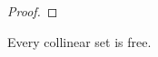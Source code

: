 \documentclass{patmorin}
\begin{document}
\begin{proof}
%
\end{proof}

\begin{cor}
  Every collinear set is free.
\end{cor}
\end{document}
